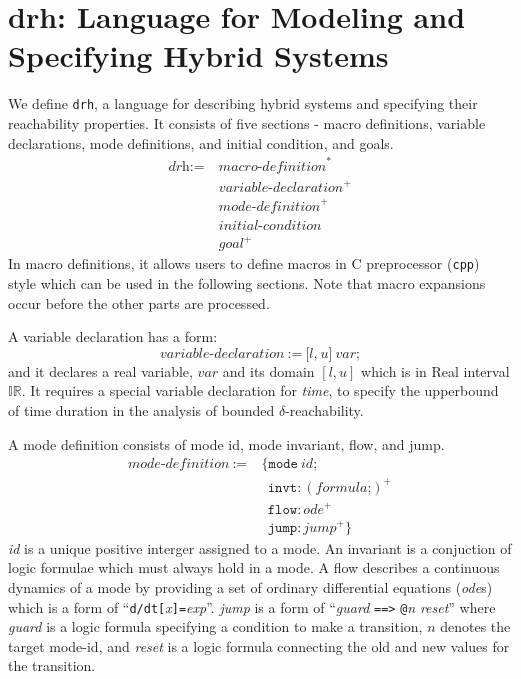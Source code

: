\section{drh: Language for Modeling and Specifying Hybrid Systems}

We define \texttt{drh}, a language for describing hybrid systems and
specifying their reachability properties. It consists of five sections
- macro definitions, variable declarations, mode definitions, and
initial condition, and goals.
\begin{align*}
  \textit{drh} := \ & \textit{macro-definition}^*\\
                    & \textit{variable-declaration}^+\\
                    & \textit{mode-definition}^+\\
                    & \textit{initial-condition}\\
                    & \textit{goal}^+
\end{align*}
In macro definitions, it allows users to define macros in C
preprocessor (\texttt{cpp}) style which can be used in the following
sections. Note that macro expansions occur before the other parts are processed.

A variable declaration has a form:
\[
\textit{variable-declaration} \ := \ \texttt{[}
                                     \textit{l}
                                     \texttt{,}
                                     \ \textit{u}
                                     \texttt{]}
                                     \ \textit{var}
                                     \texttt{;}
\]
and it declares a real variable, $var$ and its domain $[l, u]$ which
is in Real interval $\mathbb{IR}$. It requires a special variable
declaration for \textit{time}, to specify the upperbound of time
duration in the analysis of bounded $\delta$-reachability.

A mode definition consists of mode id, mode invariant, flow, and jump.
\begin{align*}
  \textit{mode-definition} \ := & \ \texttt{\{}
                                    \texttt{mode} \ \textit{id}\texttt{;}\\
                           & \ \ \  \texttt{invt}:(\textit{formula} \texttt{;})^+\\
                           & \ \ \  \texttt{flow}:\textit{ode}^+\\
                           & \ \ \ \texttt{jump}:\textit{jump}^+ \texttt{\}}
\end{align*}
\textit{id} is a unique positive interger assigned to a mode. An
invariant is a conjuction of logic formulae which must always hold in
a mode. A flow describes a continuous dynamics of a mode by providing
a set of ordinary differential equations (\textit{ode}s) which is a
form of
``\texttt{d/dt[}\textit{x}\texttt{]=}\textit{exp}''. \textit{jump} is
a form of ``\textit{guard} \texttt{==>} \texttt{@}\textit{n}
\textit{reset}'' where \textit{guard} is a logic formula specifying a
condition to make a transition, $n$ denotes the target mode-id, and
\textit{reset} is a logic formula connecting the old and new values
for the transition.

